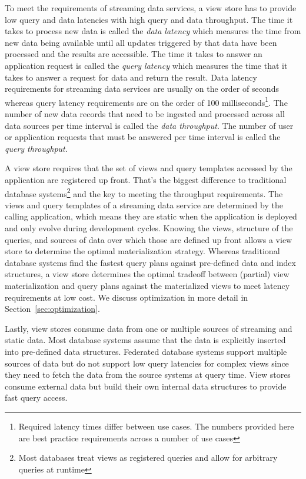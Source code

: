 \documentclass[	DIV=calc,%
							paper=letter,%
							fontsize=11pt,%
							twocolumn]{scrartcl}	 					%
\begin{document}
To meet the requirements of streaming data services, a view store has to provide low query and data latencies with high query and data throughput.
The time it takes to process new data is called the \emph{data latency} which measures the time from new data being available until all updates triggered by that data have been processed and the results are accessible. The time it takes to answer an application request is called the \emph{query latency} which measures the time that it takes to answer a request for data and return the result. Data latency requirements for streaming data services are usually on the order of seconds whereas query latency requirements are on the order of 100 milliseconds\footnote{Required latency times differ between use cases. The numbers provided here are best practice requirements across a number of use cases}.
The number of new data records that need to be ingested and processed across all data sources per time interval is called the \emph{data throughput}. The number of user or application requests that must be answered per time interval is called the \emph{query throughput}.

A view store requires that the set of views and query templates accessed by the application are registered up front. That's the biggest difference to traditional database systems\footnote{Most databases treat views as registered queries and allow for arbitrary queries at runtime} and the key to meeting the throughput requirements. The views and query templates of a streaming data service are determined by the calling application, which means they are static when the application is deployed and only evolve during development cycles. Knowing the views, structure of the queries, and sources of data over which those are defined up front allows a view store to determine the optimal materialization strategy. Whereas traditional database systems find the fastest query plans against pre-defined data and index structures, a view store determines the optimal tradeoff between (partial) view materialization and query plans against the materialized views to meet latency requirements at low cost. We discuss optimization in more detail in Section~\ref{sec:optimization}.

Lastly, view stores consume data from one or multiple sources of streaming and static data. Most database systems assume that the data is explicitly inserted into pre-defined data structures. Federated database systems support multiple sources of data but do not support low query latencies for complex views since they need to fetch the data from the source systems at query time. View stores consume external data but build their own internal data structures to provide fast query access.
\end{document}
